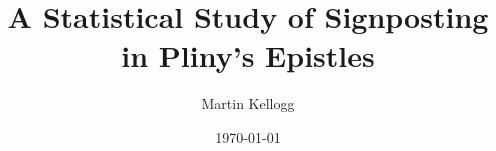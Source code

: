 \documentclass[11pt]{article}
\begin{document}
\title{A Statistical Study of Signposting in Pliny's Epistles}

\author{Martin Kellogg}

\date{\today}

\maketitle





\end{document}
